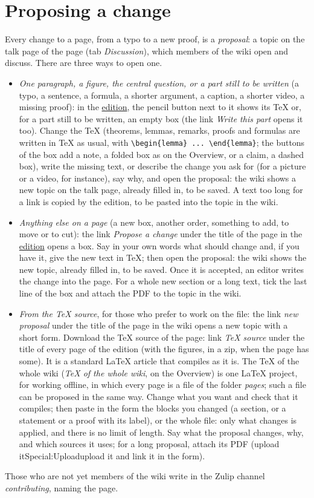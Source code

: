 \documentclass[11pt]{article}
\theoremstyle{definition}
\theoremstyle{remark}
\newcommand{\wikilink}[2]{\ifx\relax#2\relax#1\else#2\fi}
\newcommand{\nowikicode}[1]{\texttt{\frenchspacing#1}}
\begin{document}
\section{Proposing a change}
Every change to a page, from a typo to a new proof, is a \emph{proposal}: a topic on the talk page of the page (tab \emph{Discussion}), which members of the wiki open and discuss. There are three ways to open one.
\begin{itemize}
  \item \emph{One paragraph, a figure, the central question, or a part still to be written} (a typo, a sentence, a formula, a shorter argument, a caption, a shorter video, a missing proof): in the \href{https://endipa.github.io}{edition}, the pencil button next to it shows its TeX or, for a part still to be written, an empty box (the link \emph{Write this part} opens it too). Change the TeX (theorems, lemmas, remarks, proofs and formulas are written in TeX as usual, with \nowikicode{\textbackslash{}begin\{lemma\}\allowbreak{} ... \textbackslash{}end\{lemma\}}; the buttons of the box add a note, a folded box as on the Overview, or a claim, a dashed box), write the missing text, or describe the change you ask for (for a picture or a video, for instance), say why, and open the proposal: the wiki shows a new topic on the talk page, already filled in, to be saved. A text too long for a link is copied by the edition, to be pasted into the topic in the wiki.
  \item \emph{Anything else on a page} (a new box, another order, something to add, to move or to cut): the link \emph{Propose a change} under the title of the page in the \href{https://endipa.github.io}{edition} opens a box. Say in your own words what should change and, if you have it, give the new text in TeX; then open the proposal: the wiki shows the new topic, already filled in, to be saved. Once it is accepted, an editor writes the change into the page. For a whole new section or a long text, tick the last line of the box and attach the PDF to the topic in the wiki.
  \item \emph{From the TeX source}, for those who prefer to work on the file: the link \emph{new proposal} under the title of the page in the wiki opens a new topic with a short form. Download the TeX source of the page: link \emph{TeX source} under the title of every page of the edition (with the figures, in a zip, when the page has some). It is a standard LaTeX article that compiles as it is. The TeX of the whole wiki (\emph{TeX of the whole wiki}, on the Overview) is one LaTeX project, for working offline, in which every page is a file of the folder \emph{pages}; such a file can be proposed in the same way. Change what you want and check that it compiles; then paste in the form the blocks you changed (a section, or a statement or a proof with its label), or the whole file: only what changes is applied, and there is no limit of length. Say what the proposal changes, why, and which sources it uses; for a long proposal, attach its PDF (\wikilink{Special:Upload}{upload it} and link it in the form).
\end{itemize}
Those who are not yet members of the wiki write in the Zulip channel \emph{contributing}, naming the page.
\end{document}
